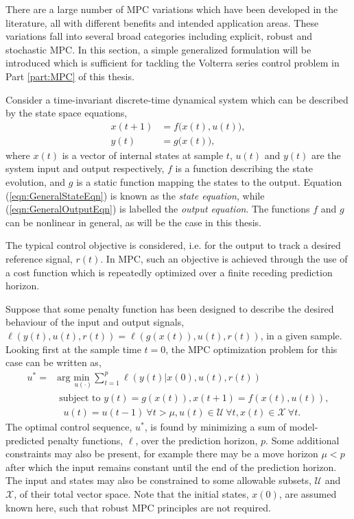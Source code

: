 There are a large number of MPC variations which have been developed in the literature, all with different benefits and intended application areas. These variations fall into several broad categories including explicit, robust and stochastic MPC. In this section, a simple generalized formulation will be introduced which is sufficient for tackling the Volterra series control problem in Part \ref{part:MPC} of this thesis.

Consider a time-invariant discrete-time dynamical system which can be described by the state space equations,
\begin{align}
x(t+1) &= f \big( x(t),u(t) \big), \label{eqn:GeneralStateEqn} \\
y(t) &= g \big( x(t) \big), \label{eqn:GeneralOutputEqn}
\end{align}
where $x(t)$ is a vector of internal states at sample $t$, $u(t)$ and $y(t)$ are the system input and output respectively, $f$ is a function describing the state evolution, and $g$ is a static function mapping the states to the output. Equation (\ref{eqn:GeneralStateEqn}) is known as the \emph{state equation}, while (\ref{eqn:GeneralOutputEqn}) is labelled the \emph{output equation}. The functions $f$ and $g$ can be nonlinear in general, as will be the case in this thesis.

The typical control objective is considered, i.e. for the output to track a desired reference signal, $r(t)$. In MPC, such an objective is achieved through the use of a cost function which is repeatedly optimized over a finite receding prediction horizon. 

Suppose that some penalty function has been designed to describe the desired behaviour of the input and output signals, $\ell(y(t),u(t),r(t)) = \ell(g(x(t)),u(t),r(t))$, in a given sample. Looking first at the sample time $t=0$, the MPC optimization problem for this case can be written as,
\begin{align}
u^* = &\text{arg } \underset{u(\cdot)}{\text{min }} \sum_{t=1}^{p} \ell(y(t)|x(0),u(t),r(t)) \label{eqn:GeneralMPCOpt} \\
& \ \textrm{subject to } y(t) = g(x(t)), x(t+1) = f(x(t),u(t)), \nonumber \\
& \ \ \ u(t) = u(t-1) \ \forall t>\mu, u(t) \in \mathcal{U} \ \forall t, x(t) \in \mathcal{X} \ \forall t. \nonumber
\end{align} 
The optimal control sequence, $u^*$, is found by minimizing a sum of model-predicted penalty functions, $\ell$, over the prediction horizon, $p$. Some additional constraints may also be present, for example there may be a move horizon $\mu<p$ after which the input remains constant until the end of the prediction horizon. The input and states may also be constrained to some allowable subsets, $\mathcal{U}$ and $\mathcal{X}$, of their total vector space. Note that the initial states, $x(0)$, are assumed known here, such that robust MPC principles are not required.

